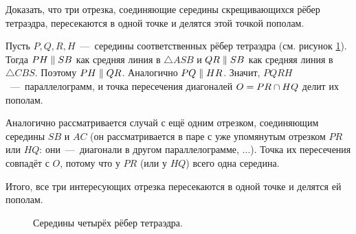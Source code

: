 \documentclass[a4paper,12pt]{article}
\begin{document}
  
  \begin{problem}[1.51]
    Доказать, что три отрезка, соединяющие середины скрещивающихся рёбер тетраэдра, пересекаются в одной точке и делятся этой точкой пополам.
  \end{problem}

  \begin{solution}
    Пусть $P, Q, R, H$~---~середины соответственных рёбер тетраэдра (см. рисунок \ref{fig:tetrahedron}).
    Тогда $PH \hm\parallel SB$ как средняя линия в $\triangle ASB$ и $QR \hm\parallel SB$ как средняя линия в $\triangle CBS$.
    Поэтому $PH \hm\parallel QR$.
    Аналогично $PQ \hm\parallel HR$.
    Значит, $PQRH$~---~параллелограмм, и точка пересечения диагоналей $O \hm= PR \hm\cap HQ$ делит их пополам.
    
    Аналогично рассматривается случай с ещё одним отрезком, соединяющим середины $SB$ и $AC$ (он рассматривается в паре с уже упомянутым отрезком $PR$ или $HQ$: они~---~диагонали в другом параллелограмме, ...). Точка их пересечения совпадёт с $O$, потому что у $PR$ (или у $HQ$) всего одна середина.
    
    Итого, все три интересующих отрезка пересекаются в одной точке и делятся ей пополам.
    
    \begin{figure}[h]
      \centering
      
      
      \caption{Середины четырёх рёбер тетраэдра.}
      \label{fig:tetrahedron}
    \end{figure}
  \end{solution}
  
\end{document}
